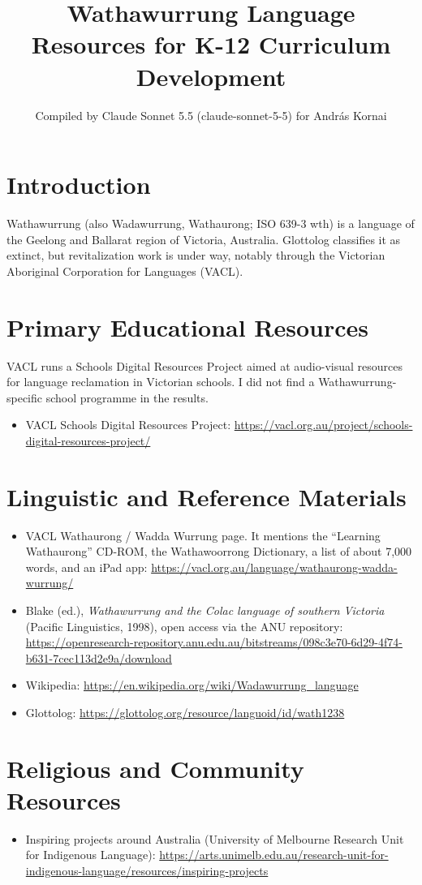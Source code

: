 \documentclass[12pt]{article}
\title{Wathawurrung Language Resources for K-12 Curriculum Development}
\author{Compiled by Claude Sonnet 5.5 (claude-sonnet-5-5) for Andr\'as Kornai}
\date{}
\begin{document}
\maketitle

\section{Introduction}
Wathawurrung (also Wadawurrung, Wathaurong; ISO 639-3 wth) is a language of the Geelong and Ballarat region of Victoria, Australia. Glottolog classifies it as extinct, but revitalization work is under way, notably through the Victorian Aboriginal Corporation for Languages (VACL).

\section{Primary Educational Resources}
VACL runs a Schools Digital Resources Project aimed at audio-visual resources for language reclamation in Victorian schools. I did not find a Wathawurrung-specific school programme in the results.
\begin{itemize}
\item VACL Schools Digital Resources Project: \url{https://vacl.org.au/project/schools-digital-resources-project/}
\end{itemize}

\section{Linguistic and Reference Materials}
\begin{itemize}
\item VACL Wathaurong / Wadda Wurrung page. It mentions the ``Learning Wathaurong'' CD-ROM, the Wathawoorrong Dictionary, a list of about 7,000 words, and an iPad app: \url{https://vacl.org.au/language/wathaurong-wadda-wurrung/}
\item Blake (ed.), \emph{Wathawurrung and the Colac language of southern Victoria} (Pacific Linguistics, 1998), open access via the ANU repository: \url{https://openresearch-repository.anu.edu.au/bitstreams/098c3e70-6d29-4f74-b631-7cec113d2e9a/download}
\item Wikipedia: \url{https://en.wikipedia.org/wiki/Wadawurrung_language}
\item Glottolog: \url{https://glottolog.org/resource/languoid/id/wath1238}
\end{itemize}

\section{Religious and Community Resources}
\begin{itemize}
\item Inspiring projects around Australia (University of Melbourne Research Unit for Indigenous Language): \url{https://arts.unimelb.edu.au/research-unit-for-indigenous-language/resources/inspiring-projects}
\end{itemize}
\end{document}
